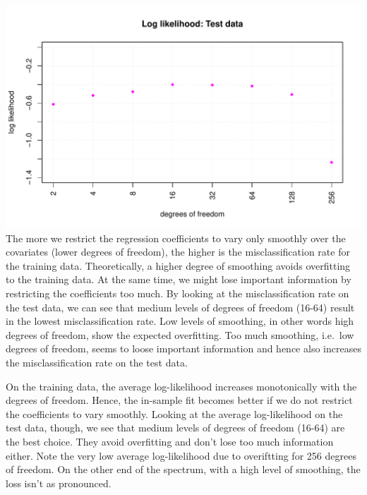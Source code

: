 \documentclass[
]{article}
\begin{document}
\includegraphics{A2_files/figure-latex/unnamed-chunk-33-4.pdf} The more
we restrict the regression coefficients to vary only smoothly over the
covariates (lower degrees of freedom), the higher is the
misclassification rate for the training data. Theoretically, a higher
degree of smoothing avoids overfitting to the training data. At the same
time, we might lose important information by restricting the
coefficients too much. By looking at the misclassification rate on the
test data, we can see that medium levels of degrees of freedom (16-64)
result in the lowest misclassification rate. Low levels of smoothing, in
other words high degrees of freedom, show the expected overfitting. Too
much smoothing, i.e.~low degrees of freedom, seems to loose important
information and hence also increases the misclassification rate on the
test data.

On the training data, the average log-likelihood increases monotonically
with the degrees of freedom. Hence, the in-sample fit becomes better if
we do not restrict the coefficients to vary smoothly. Looking at the
average log-likelihood on the test data, though, we see that medium
levels of degrees of freedom (16-64) are the best choice. They avoid
overfitting and don't lose too much information either. Note the very
low average log-likelihood due to overiftting for 256 degrees of
freedom. On the other end of the spectrum, with a high level of
smoothing, the loss isn't as pronounced.
\end{document}
